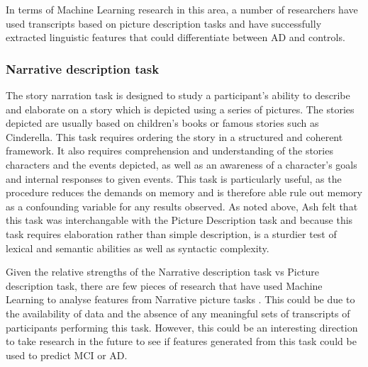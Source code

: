 \documentclass{article}
\begin{document}
\par
In terms of Machine Learning research in this area, a number of researchers have used transcripts based on picture description tasks \cite{Zimmerer2016, Orimaye2017, Mueller2018a, Fraser2015} and have successfully extracted linguistic features that could differentiate between AD and controls.\newline
\par
\subsubsection{Narrative description task}
The story narration task is designed to study a participant's ability to describe and elaborate on a story which is depicted using a series of pictures. The stories depicted are usually based on children's books or famous stories such as Cinderella. \cite{Fraser2014} This task requires ordering the story in a structured and coherent framework. It also requires comprehension and understanding of the stories characters and the events depicted, as well as an awareness of a character's goals and internal responses to given events. This task is particularly useful, as the procedure reduces the demands on memory and is therefore able rule out memory as a confounding variable for any results observed. As noted above, Ash \cite{Ash2012} felt that this task was interchangable with the Picture Description task and because this task requires elaboration rather than simple description, is a sturdier test of lexical and semantic abilities as well as syntactic complexity. \cite{DeLira2011} \newline
\par
Given the relative strengths of the Narrative description task vs Picture description task, there are few pieces of research  that have used Machine Learning to analyse features from Narrative picture tasks \cite{Fraser2014}. This could be due to the availability of data and the absence of any meaningful sets of transcripts of participants performing this task. However, this could be an interesting direction to take research in the future to see if features generated from this task could be used to predict MCI or AD.  \newline
\par
\end{document}
